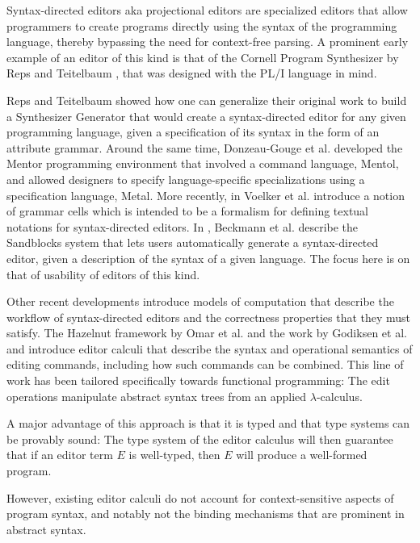 \documentclass[sigplan,review]{acmart}
\begin{document}
Syntax-directed editors aka projectional editors are specialized
editors that allow programmers to create programs directly using the
syntax of the programming language, thereby bypassing the need for
context-free parsing. A prominent early example of an
editor of this kind is that of the Cornell Program Synthesizer by Reps and
Teitelbaum \cite{10.1145/358746.358755}, that was designed with the
PL/I language in mind.

Reps and Teitelbaum showed \cite{10.1145/390011.808247} how one can
generalize their original work to build a Synthesizer Generator that
would create a syntax-directed editor for any given programming
language, given a specification of its syntax in the form of an
attribute grammar. Around the same time, Donzeau-Gouge et
al. developed the Mentor programming environment
\cite{10.5555/800054.801990} that involved a command language, Mentol,
and allowed designers to specify language-specific specializations
using a specification language, Metal. More recently, in
\cite{10.1145/2997364.2997365} Voelker et al. introduce a notion of
grammar cells which is intended to be a formalism for defining textual
notations for syntax-directed editors. In
\cite{10.1145/3544548.3580785}, Beckmann et al. describe the
Sandblocks system that lets users automatically generate a
syntax-directed editor, given a description of the syntax of a given
language. The focus here is on that of usability of editors of this
kind.

Other recent developments introduce models of computation that
describe the workflow of syntax-directed editors and the correctness
properties that they must satisfy. The Hazelnut framework by Omar et
al. \cite{hazelnut} and the work by Godiksen et al. and
\cite{type_safe_structure_editor} introduce editor calculi that
describe the syntax and operational semantics of editing commands,
including how such commands can be combined. This line of work has
been tailored specifically towards functional programming: The edit
operations manipulate abstract syntax trees from an applied
$\lambda$-calculus.

A major advantage of this approach is that it is typed and that type
systems can be provably sound: The type system of the editor calculus
will then guarantee that if an editor term $E$ is well-typed, then $E$
will produce a well-formed program.

However, existing editor calculi do not account for context-sensitive
aspects of program syntax, and notably not the binding 
mechanisms that are prominent in abstract syntax.
\end{document}
